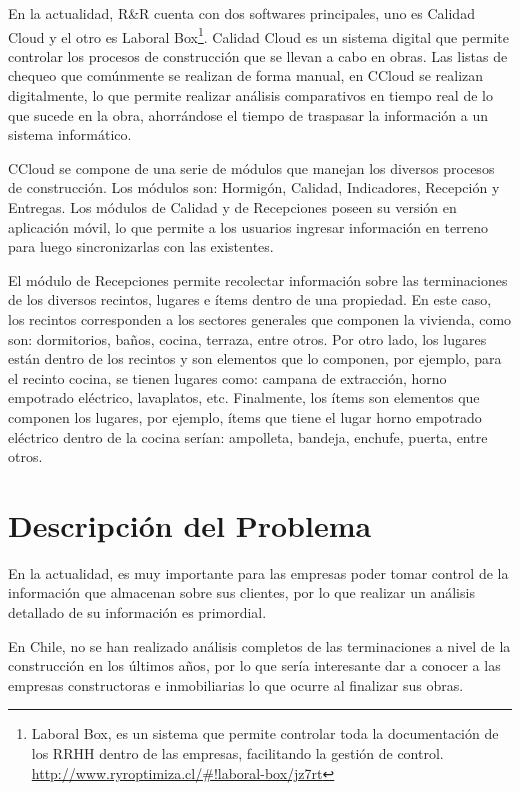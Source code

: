 \documentclass[letter,12pt,oneside]{report}
\begin{document}
En la actualidad, R\&R cuenta con dos softwares principales, uno es Calidad Cloud y el otro es Laboral Box\footnote{Laboral Box, es un sistema que permite controlar toda la documentación de los RRHH dentro de las empresas, facilitando la gestión de control. \url{http://www.ryroptimiza.cl/\#!laboral-box/jz7rt}}. Calidad Cloud es un sistema digital que permite controlar los procesos de construcción que se llevan a cabo en obras. Las listas de chequeo que comúnmente se realizan de forma manual, en CCloud se realizan digitalmente, lo que permite realizar análisis comparativos en tiempo real de lo que sucede en la obra, ahorrándose el tiempo de traspasar la información a un sistema informático.

CCloud se compone de una serie de módulos que manejan los diversos procesos de construcción. Los módulos son: Hormigón, Calidad, Indicadores, Recepción y Entregas. Los módulos de Calidad y de Recepciones poseen su versión en aplicación móvil, lo que permite a los usuarios ingresar información en terreno para luego sincronizarlas con las existentes.

El módulo de Recepciones permite recolectar información sobre las terminaciones de los diversos recintos, lugares e ítems dentro de una propiedad. En este caso, los recintos corresponden a los sectores generales que componen la vivienda, como son: dormitorios, baños, cocina, terraza, entre otros. Por otro lado, los lugares están dentro de los recintos y son elementos que lo componen, por ejemplo, para el recinto cocina, se tienen lugares como: campana de extracción, horno empotrado eléctrico, lavaplatos, etc. Finalmente, los ítems son elementos que componen los lugares, por ejemplo, ítems que tiene el lugar horno empotrado eléctrico dentro de la cocina serían: ampolleta, bandeja, enchufe, puerta, entre otros.

\section{Descripción del Problema}
En la actualidad, es muy importante para las empresas poder tomar control de la información que almacenan sobre sus clientes, por lo que realizar un análisis detallado de su información es primordial.

En Chile, no se han realizado análisis completos de las terminaciones a nivel de la construcción en los últimos años, por lo que sería interesante dar a conocer a las empresas constructoras e inmobiliarias lo que ocurre al finalizar sus obras.
\end{document}
